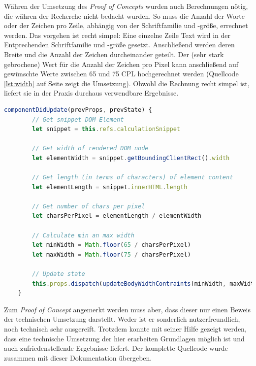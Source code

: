 Währen der Umsetzung des \textit{Proof of Concepts} wurden auch Berechnungen nötig, die währen der Recherche nicht bedacht wurden. So muss die Anzahl der Worte oder der Zeichen pro Zeile, abhängig von der Schriftfamilie und -größe, errechnet werden. Das vorgehen ist recht simpel: Eine einzelne Zeile Text wird in der Entprechenden Schriftfamilie und -größe gesetzt. Anschließend werden deren Breite und die Anzahl der Zeichen durcheinander geteilt. Der (sehr stark gebrochene) Wert für die Anzahl der Zeichen pro Pixel kann anschließend auf gewünschte Werte zwischen 65 und 75 CPL hochgerechnet werden (Quellcode \ref{lst:width} auf Seite \pageref{lst:width} zeigt die Umsetzung). Obwohl die Rechnung recht simpel ist, liefert sie in der Praxis durchaus verwendbare Ergebnisse.

\begin{lstlisting}[caption={Berechnung der Mindest- und Maximalweite des Fließtextes},label={lst:width},language=javascript]
	componentDidUpdate(prevProps, prevState) {
	    // Get snippet DOM Element
	    let snippet = this.refs.calculationSnippet
	
	    // Get width of rendered DOM node
	    let elementWidth = snippet.getBoundingClientRect().width
	
	    // Get length (in terms of characters) of element content
	    let elementLength = snippet.innerHTML.length
	
	    // Get number of chars per pixel
	    let charsPerPixel = elementLength / elementWidth
	
	    // Calculate min an max width
	    let minWidth = Math.floor(65 / charsPerPixel)
	    let maxWidth = Math.floor(75 / charsPerPixel)
	
	    // Update state
	    this.props.dispatch(updateBodyWidthContraints(minWidth, maxWidth))
  	}
\end{lstlisting}

Zum \textit{Proof of Concept} angemerkt werden muss aber, dass dieser nur einen Beweis der technischen Umsetzung darstellt. Weder ist er sonderlich nutzerfreundlich, noch technisch sehr ausgereift. Trotzdem konnte mit seiner Hilfe gezeigt werden, dass eine technische Umsetzung der hier erarbeiten Grundlagen möglich ist und auch zufriedenstellende Ergebnisse liefert. Der komplette Quellcode wurde zusammen mit dieser Dokumentation übergeben.

\clearpage
